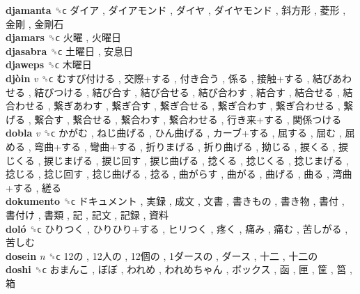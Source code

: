 \textbf{djamanta} ␝ϲ   ダイア ,  ダイアモンド ,  ダイヤ ,  ダイヤモンド ,  斜方形 ,  菱形 ,  金剛 ,  金剛石   \\
\textbf{djamars} ␝ϲ   火曜 ,  火曜日   \\
\textbf{djasabra} ␝ϲ   土曜日 ,  安息日   \\
\textbf{djaweps} ␝ϲ   木曜日   \\
\textbf{djòin} \emph{v}  ␝ϲ   むすび付ける ,  交際+する ,  付き合う ,  係る ,  接触+する ,  結びあわせる ,  結びつける ,  結び合す ,  結び合せる ,  結び合わす ,  結合す ,  結合せる ,  結合わせる ,  繋ぎあわす ,  繋ぎ合す ,  繋ぎ合せる ,  繋ぎ合わす ,  繋ぎ合わせる ,  繋げる ,  繋合す ,  繋合せる ,  繋合わす ,  繋合わせる ,  行き来+する ,  関係つける   \\
\textbf{dobla} \emph{v}  ␝ϲ   かがむ ,  ねじ曲げる ,  ひん曲げる ,  カーブ+する ,  屈する ,  屈む ,  屈める ,  弯曲+する ,  彎曲+する ,  折りまげる ,  折り曲げる ,  拗じる ,  捩くる ,  捩じくる ,  捩じまげる ,  捩じ回す ,  捩じ曲げる ,  捻くる ,  捻じくる ,  捻じまげる ,  捻じる ,  捻じ回す ,  捻じ曲げる ,  捻る ,  曲がらす ,  曲がる ,  曲げる ,  曲る ,  湾曲+する ,  縒る   \\
\textbf{dokumento} ␝ϲ   ドキュメント ,  実録 ,  成文 ,  文書 ,  書きもの ,  書き物 ,  書付 ,  書付け ,  書類 ,  記 ,  記文 ,  記録 ,  資料   \\
\textbf{doló} ␝ϲ   ひりつく ,  ひりひり+する ,  ヒリつく ,  疼く ,  痛み ,  痛む ,  苦しがる ,  苦しむ   \\
\textbf{dosein} \emph{n}  ␝ϲ   12の ,  12人の ,  12個の ,  1ダースの ,  ダース ,  十二 ,  十二の   \\
\textbf{doshi} ␝ϲ   おまんこ ,  ぼぼ ,  われめ ,  われめちゃん ,  ボックス ,  函 ,  匣 ,  筐 ,  筥 ,  箱   \\

